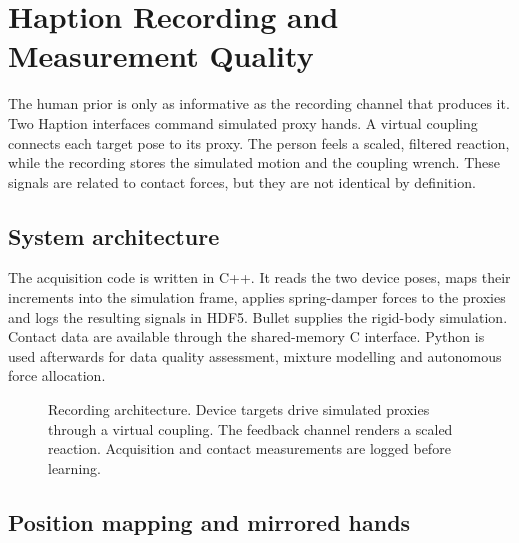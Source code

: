 \chapter{Haption Recording and Measurement Quality}
\label{ch:haption}

The human prior is only as informative as the recording channel that produces it. Two Haption interfaces command simulated proxy hands. A virtual coupling connects each target pose to its proxy. The person feels a scaled, filtered reaction, while the recording stores the simulated motion and the coupling wrench. These signals are related to contact forces, but they are not identical by definition.

\section{System architecture}

The acquisition code is written in C++. It reads the two device poses, maps their increments into the simulation frame, applies spring-damper forces to the proxies and logs the resulting signals in HDF5. Bullet supplies the rigid-body simulation. Contact data are available through the shared-memory C interface. Python is used afterwards for data quality assessment, mixture modelling and autonomous force allocation.

\begin{figure}[htbp]\centering
{}
\caption{Recording architecture. Device targets drive simulated proxies through a virtual coupling. The feedback channel renders a scaled reaction. Acquisition and contact measurements are logged before learning.}
\label{fig:recording}
\end{figure}

\section{Position mapping and mirrored hands}

